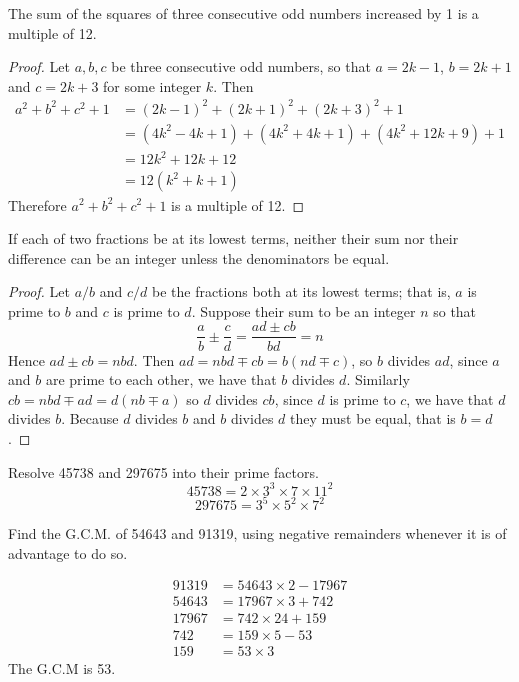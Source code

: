 \documentclass[DIN, pagenumber=false, fontsize=11pt, parskip=half]{scrartcl}
\begin{document}
\begin{problems}[from=1,step=1]
    \problem The sum of the squares of three consecutive odd numbers increased by 1 is a multiple of 12.

    \begin{proof}
        Let $a,b,c$ be three consecutive odd numbers, so that $a=2k-1$, $b=2k+1$ and $c=2k+3$ for some integer $k$.
        Then
        \begin{align*}
            a^2 + b^2 + c^2 + 1 &= (2k-1)^2 + (2k+1)^2 + (2k+3)^2 + 1\\ 
                                &= (4k^2-4k+1) + (4k^2+4k+1) + (4k^2+12k+9) + 1\\ 
                                &= 12k^2 + 12k + 12\\ 
                                &= 12(k^2+k+1)
        \end{align*}
        Therefore $a^2 + b^2 + c^2 + 1$ is a multiple of 12.
    \end{proof}

    \problem If each of two fractions be at its lowest terms, neither their sum nor their difference can be an integer unless the denominators be equal.

    \begin{proof}
        Let $a/b$ and $c/d$ be the fractions both at its lowest terms; that is, $a$ is prime to $b$ and $c$ is prime to $d$. Suppose their sum to be an integer $n$ so that 
        \[
            \frac{a}{b} \pm \frac{c}{d} = \frac{ad \pm cb}{bd} = n
        \]
        Hence $ad \pm cb = nbd$.
        Then $ad = nbd \mp cb = b(nd \mp c)$, so $b$ divides $ad$, since $a$ and $b$ are prime to each other, we have that $b$ divides $d$.
        Similarly $cb = nbd \mp ad = d(nb \mp a)$ so $d$ divides $cb$, since $d$ is prime to $c$, we have that $d$ divides $b$.
        Because $d$ divides $b$ and $b$ divides $d$ they must be equal, that is $b = d$.
    \end{proof}

    \problem Resolve 45738 and 297675 into their prime factors.
    \answer 
    \[ 
        45738 = 2 \times 3^3 \times 7 \times 11^2
    \]
    \[
        297675 = 3^5 \times 5^2 \times 7^2
    \]

    \problem Find the G.C.M. of 54643 and 91319, using negative remainders whenever it is of advantage to do so.
    
    \answer 
    \begin{align*}
        91319 &= 54643 \times 2 - 17967\\ 
        54643 &= 17967 \times 3 + 742\\ 
        17967 &= 742 \times 24 + 159\\ 
        742 &= 159 \times 5 - 53\\ 
        159 &= 53 \times 3 
    \end{align*}
    The G.C.M is 53.


\end{problems}
\end{document}
